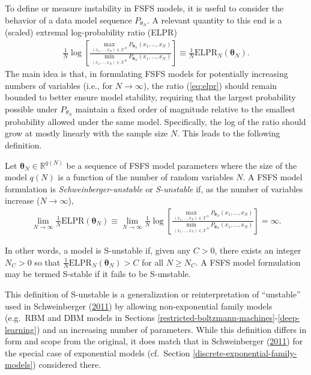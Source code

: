 \documentclass[12pt]{article}
\theoremstyle{definition}
\let\BeginKnitrBlock\begin \let\EndKnitrBlock\end
\begin{document}
To define or measure instability in FSFS models, it is useful to
consider the behavior of a data model sequence \(P_{\theta_N}\). A
relevant quantity to this end is a (scaled) extremal log-probability
ratio (ELPR)
\begin{align}
\frac{1}{N} \log \left[\frac{\max\limits_{(x_1, \dots, x_N) \in \mathcal{X}^N}P_{\boldsymbol \theta_N}(x_1, \dots, x_N)}{\min\limits_{(x_1, \dots, x_N) \in \mathcal{X}^N}P_{\boldsymbol \theta_N}(x_1, \dots, x_N)}\right] \equiv \frac{1}{N} \text{ELPR}_N(\boldsymbol \theta_N). \label{eq:elpr}
\end{align}
The main idea is that, in formulating FSFS models for potentially
increasing numbers of variables (i.e., for \(N \rightarrow \infty\)),
the ratio (\eqref{eq:elpr}) should remain bounded to better ensure model
stability, requiring that the largest probability possible under
\(P_{\theta_N}\) maintain a fixed order of magnitude relative to the
smallest probability allowed under the same model. Specifically, the log
of the ratio should grow at mostly linearly with the sample size \(N\).
This leads to the following definition.
\BeginKnitrBlock{definition}[S-unstable FSFS]
\protect\hypertarget{def:instabFSFS}{}{\label{def:instabFSFS}
\iffalse (S-unstable FSFS) \fi{} }Let
\(\boldsymbol \theta_N \in \mathbb{R}^{q(N)}\) be a sequence of FSFS
model parameters where the size of the model \(q(N)\) is a function of
the number of random variables \(N\). A FSFS model formulation is
\emph{Schweinberger-unstable} or \emph{S-unstable} if, as the number of
variables increase (\(N \rightarrow \infty\)),
\begin{align*}
\lim\limits_{N \rightarrow \infty} \frac{1}{N} \text{ELPR}(\boldsymbol \theta_N) \equiv \lim\limits_{N \rightarrow \infty} \frac{1}{N} \log \left[\frac{\max\limits_{(x_1, \dots, x_N) \in \mathcal{X}^N}P_{\boldsymbol \theta_N}(x_1, \dots, x_N)}{\min\limits_{(x_1, \dots, x_N) \in \mathcal{X}^N}P_{\boldsymbol \theta_N}(x_1, \dots, x_N)}\right] = \infty.
\end{align*}
\EndKnitrBlock{definition} In other words, a model is S-unstable if,
given any \(C > 0\), there exists an integer \(N_C > 0\) so that
\(\frac{1}{N}\text{ELPR}_N(\boldsymbol \theta_N) > C\) for all
\(N \ge N_C\). A FSFS model formulation may be termed S-stable if it
fails to be S-unstable.

This definition of S-unstable is a generalization or reinterpretation of
``unstable'' used in Schweinberger
(\protect\hyperlink{ref-schweinberger2011instability}{2011}) by allowing
non-exponential family models (e.g.~RBM and DBM models in Sections
\ref{restricted-boltzmann-machines}-\ref{deep-learning}) and an
increasing number of parameters. While this definition differs in form
and scope from the original, it does match that in Schweinberger
(\protect\hyperlink{ref-schweinberger2011instability}{2011}) for the
special case of exponential models (cf.~Section
\ref{discrete-exponential-family-models}) considered there.
\end{document}
